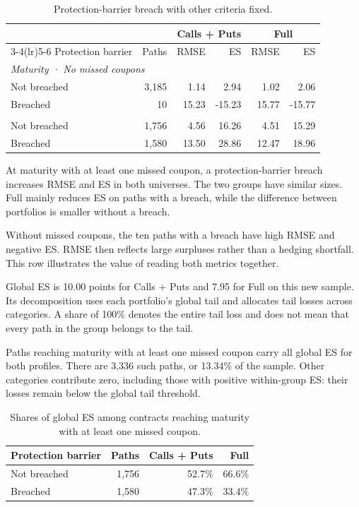 \documentclass[12pt,a4paper]{article}
\newcommand{\1}{\mathbf{1}}
\begin{document}
\begin{table}[H]
\centering
\small
\setlength{\tabcolsep}{4pt}
\begin{tabular}{lrrrrr}
\toprule
 & & \multicolumn{2}{c}{Calls + Puts} & \multicolumn{2}{c}{Full} \\
\cmidrule(lr){3-4}\cmidrule(lr){5-6}
Protection barrier & Paths & RMSE & ES & RMSE & ES \\
\midrule
\multicolumn{6}{l}{\textit{Maturity · No missed coupons}} \\
\addlinespace[2pt]
Not breached & 3,185 & 1.14 & 2.94 & 1.02 & 2.06 \\
Breached & 10 & 15.23 & -15.23 & 15.77 & -15.77 \\
\addlinespace[4pt]
\multicolumn{6}{l}{\textit{Maturity · Missed coupon}} \\
\addlinespace[2pt]
Not breached & 1,756 & 4.56 & 16.26 & 4.51 & 15.29 \\
Breached & 1,580 & 13.50 & 28.86 & 12.47 & 18.96 \\
\bottomrule
\end{tabular}

\caption{Protection-barrier breach with other criteria fixed.}
\label{tab:tail-barrier-comparison}
\end{table}

At maturity with at least one missed coupon, a protection-barrier breach increases RMSE and ES in both universes. The two groups have similar sizes. Full mainly reduces ES on paths with a breach, while the difference between portfolios is smaller without a breach.

Without missed coupons, the ten paths with a breach have high RMSE and negative ES. RMSE then reflects large surpluses rather than a hedging shortfall. This row illustrates the value of reading both metrics together.

Global ES is 10.00 points for Calls + Puts and 7.95 for Full on this new sample. Its decomposition uses each portfolio’s global tail and allocates tail losses across categories. A share of 100\% denotes the entire tail loss and does not mean that every path in the group belongs to the tail.

Paths reaching maturity with at least one missed coupon carry all global ES for both profiles. There are 3,336 such paths, or 13.34\% of the sample. Other categories contribute zero, including those with positive within-group ES: their losses remain below the global tail threshold.

\begin{table}[H]
\centering
\small
\begin{tabular}{lrrr}
\toprule
Protection barrier & Paths & Calls + Puts & Full \\
\midrule
Not breached & 1,756 & 52.7\% & 66.6\% \\
Breached & 1,580 & 47.3\% & 33.4\% \\
\bottomrule
\end{tabular}
\caption{Shares of global ES among contracts reaching maturity with at least one missed coupon.}
\label{tab:tail-global-shares}
\end{table}
\end{document}
